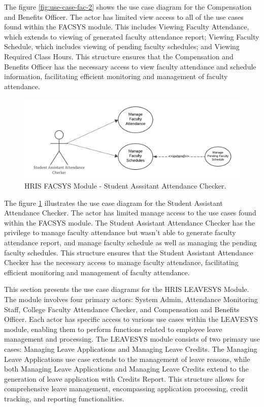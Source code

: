    The figure \ref{fig:use-case-fac-2} shows the use case diagram for the Compensation and Benefits Officer. The actor has limited view access to all of the use cases found within the FACSYS module. This includes Viewing Faculty Attendance, which extends to viewing of generated faculty attendance report; Viewing Faculty Schedule, which includes viewing of pending faculty schedules; and Viewing Required Class Hours. This structure ensures that the Compensation and Benefits Officer has the necessary access to view faculty attendance and schedule information, facilitating efficient monitoring and management of faculty attendance.

    \begin{figure}[H]
        \centering
        \includegraphics[width=0.9\linewidth]{figures/images/diagrams/usecase/use-case-fac-3.png}
        \caption{HRIS FACSYS Module - Student Asssitant Attendance Checker.}
        \label{fig:use-case-fac-3}
    \end{figure}

    The figure \ref{fig:use-case-fac-3} illustrates the use case diagram for the Student Assistant Attendance Checker. The actor has limited manage access to the use cases found within the FACSYS module. The Student Assistant Attendance Checker has the privilege to manage faculty attendance but wasn't able to generate faculty attendance report, and manage faculty schedule as well as managing the pending faculty schedules. This structure ensures that the Student Assistant Attendance Checker has the necessary access to manage faculty attendance, facilitating efficient monitoring and management of faculty attendance. 
    

    This section presents the use case diagrams for the HRIS LEAVESYS Module. The module involves four primary actors: System Admin, Attendance Monitoring Staff, College Faculty Attendance Checker, and Compensation and Benefits Officer. Each actor has specific access to various use cases within the LEAVESYS module, enabling them to perform functions related to employee leave management and processing. The LEAVESYS module consists of two primary use cases: Managing Leave Applications and Managing Leave Credits. The Managing Leave Applications use case extends to the management of leave reasons, while both Managing Leave Applications and Managing Leave Credits extend to the generation of leave application with Credits Report. This structure allows for comprehensive leave management, encompassing application processing, credit tracking, and reporting functionalities.

